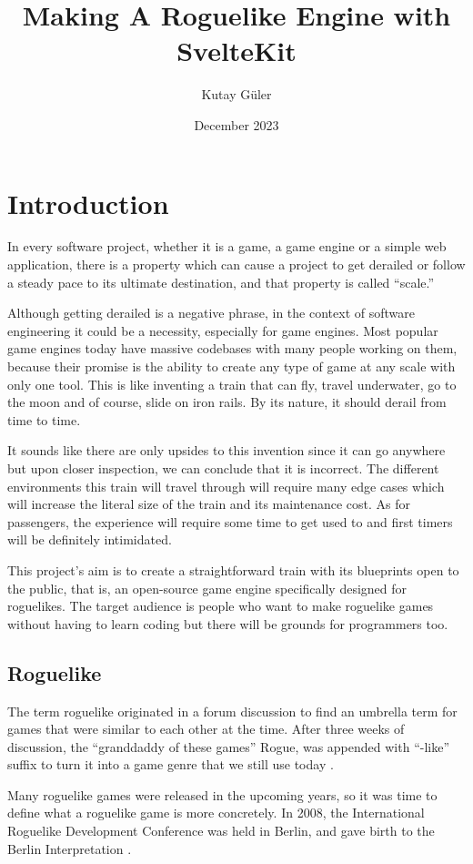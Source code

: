 \documentclass{article}
\title{Making A Roguelike Engine with SvelteKit}
\author{Kutay Güler}
\date{December 2023}
\begin{document}
\maketitle
\tableofcontents

\section{Introduction}
In every software project, whether it is a game, a game engine or a simple web application, there is a property which can cause a project to get derailed or follow a steady pace to its ultimate destination, and that property is called “scale.” 

Although getting derailed is a negative phrase, in the context of software engineering it could be a necessity, especially for game engines. Most popular game engines today have massive codebases with many people working on them, because their promise is the ability to create any type of game at any scale with only one tool. This is like inventing a train that can fly, travel underwater, go to the moon and of course, slide on iron rails. By its nature, it should derail from time to time. 

It sounds like there are only upsides to this invention since it can go anywhere but upon closer inspection, we can conclude that it is incorrect. The different environments this train will travel through will require many edge cases which will increase the literal size of the train and its maintenance cost. As for passengers, the experience will require some time to get used to and first timers will be definitely intimidated. 

This project’s aim is to create a straightforward train with its blueprints open to the public, that is, an open-source game engine specifically designed for roguelikes. The target audience is people who want to make roguelike games without having to learn coding but there will be grounds for programmers too. 

\subsection{Roguelike}
The term roguelike originated in a forum discussion to find an umbrella term for games that were similar to each other at the time. After three weeks of discussion, the “granddaddy of these games” Rogue, was appended with “-like” suffix to turn it into a game genre that we still use today \cite{roguelike-term}. 

Many roguelike games were released in the upcoming years, so it was time to define what a roguelike game is more concretely. In 2008, the International Roguelike Development Conference was held in Berlin, and gave birth to the Berlin Interpretation \cite{berlin}.
\end{document}
